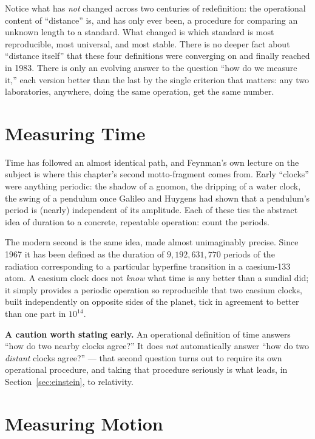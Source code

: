 \documentclass[12pt]{book}
\begin{document}
Notice what has \emph{not} changed across two centuries of redefinition: the operational content of ``distance'' is, and has only ever been, a procedure for comparing an unknown length to a standard. What changed is which standard is most reproducible, most universal, and most stable. There is no deeper fact about ``distance itself'' that these four definitions were converging on and finally reached in 1983. There is only an evolving answer to the question ``how do we measure it,'' each version better than the last by the single criterion that matters: any two laboratories, anywhere, doing the same operation, get the same number.

\section{Measuring Time}
\label{sec:time}

Time has followed an almost identical path, and Feynman's own lecture on the subject is where this chapter's second motto-fragment comes from. Early ``clocks'' were anything periodic: the shadow of a gnomon, the dripping of a water clock, the swing of a pendulum once Galileo and Huygens had shown that a pendulum's period is (nearly) independent of its amplitude. Each of these ties the abstract idea of duration to a concrete, repeatable operation: count the periods.

The modern second is the same idea, made almost unimaginably precise. Since 1967 it has been defined as the duration of \(9{,}192{,}631{,}770\) periods of the radiation corresponding to a particular hyperfine transition in a caesium-133 atom. A caesium clock does not \emph{know} what time is any better than a sundial did; it simply provides a periodic operation so reproducible that two caesium clocks, built independently on opposite sides of the planet, tick in agreement to better than one part in \(10^{14}\).

\begin{mdframed}[backgroundcolor=gray!8, linecolor=gray!40, linewidth=0.6pt, roundcorner=3pt]
\textbf{A caution worth stating early.} An operational definition of time answers ``how do two nearby clocks agree?'' It does \emph{not} automatically answer ``how do two \emph{distant} clocks agree?'' --- that second question turns out to require its own operational procedure, and taking that procedure seriously is what leads, in Section~\ref{sec:einstein}, to relativity.
\end{mdframed}

\section{Measuring Motion}
\label{sec:motion}
\end{document}
